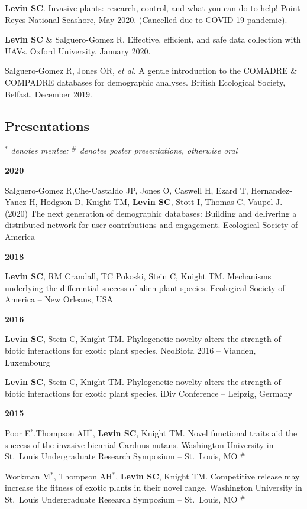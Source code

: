 \documentclass[11pt,]{article}
\begin{document}
\textbf{Levin SC}. Invasive plants: research, control, and what you can
do to help! Point Reyes National Seashore, May 2020. (Cancelled due to
COVID-19 pandemic).

\textbf{Levin SC} \& Salguero-Gomez R. Effective, efficient, and safe
data collection with UAVs. Oxford University, January 2020.

Salguero-Gomez R, Jones OR, \emph{et al.} A gentle introduction to the
COMADRE \& COMPADRE databases for demographic analyses. British
Ecological Society, Belfast, December 2019.

\hypertarget{presentations}{%
\subsection{Presentations}\label{presentations}}

\(^\ast\) \emph{denotes mentee; \(^\#\) denotes poster presentations,
otherwise oral}

\textbf{2020}

Salguero-Gomez R,Che-Castaldo JP, Jones O, Caswell H, Ezard T,
Hernandez-Yanez H, Hodgson D, Knight TM, \textbf{Levin SC}, Stott I,
Thomas C, Vaupel J. (2020) The next generation of demographic databases:
Building and delivering a distributed network for user contributions and
engagement. Ecological Society of America

\textbf{2018}

\textbf{Levin SC}, RM Crandall, TC Pokoski, Stein C, Knight TM.
Mechanisms underlying the differential success of alien plant species.
Ecological Society of America -- New Orleans, USA

\textbf{2016}

\textbf{Levin SC}, Stein C, Knight TM. Phylogenetic novelty alters the
strength of biotic interactions for exotic plant species. NeoBiota 2016
-- Vianden, Luxembourg

\textbf{Levin SC}, Stein C, Knight TM. Phylogenetic novelty alters the
strength of biotic interactions for exotic plant species. iDiv
Conference -- Leipzig, Germany

\textbf{2015}

Poor E\(^\ast\),Thompson AH\(^\ast\), \textbf{Levin SC}, Knight TM.
Novel functional traits aid the success of the invasive biennial Carduus
nutans. Washington University in St.~Louis Undergraduate Research
Symposium -- St.~Louis, MO \(^\#\)

Workman M\(^\ast\), Thompson AH\(^\ast\), \textbf{Levin SC}, Knight TM.
Competitive release may increase the fitness of exotic plants in their
novel range. Washington University in St.~Louis Undergraduate Research
Symposium -- St.~Louis, MO \(^\#\)
\end{document}
